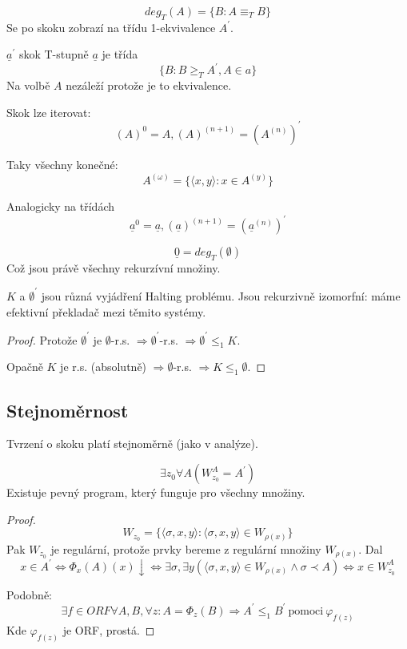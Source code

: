 \begin{note}
	\[ deg_T(A) = \{ B: A \equiv_T B \} \]
	Se po skoku zobrazí na třídu 1-ekvivalence $A^{\prime}$.

\end{note}

\begin{definition}\label{jump_T}
	$\underline{a}^{\prime}$ skok T-stupně $\underline{a}$ je třída
	\[ \{ B: B \geq_T A^{\prime}, A \in a \} \]
	Na volbě $A$ nezáleží protože je to ekvivalence.
\end{definition}

\begin{note}
	Skok lze iterovat:
	\[ (A)^0 = A, (A)^{(n + 1)} = (A^{(n)})^{\prime} \]

	Taky všechny konečné:
	\[ A^{(\omega)} = \{ \langle x, y \rangle: x \in A^{(y)} \} \]

	Analogicky na třídách
	\[ \underline{a}^0 = \underline{a}, (\underline{a})^{(n + 1)} = (\underline{a}^{(n)})^{\prime} \]
\end{note}

\begin{observation}
	\[ \underline{0} = deg_T(\emptyset) \]
	Což jsou právě všechny rekurzívní množiny.
\end{observation}

\begin{observation}
	$K$ a $\emptyset^{\prime}$ jsou různá vyjádření Halting problému.
	Jsou rekurzivně izomorfní: máme efektivní překladač mezi těmito systémy.
\end{observation}
\begin{proof}
	Protože $\emptyset^{\prime}$ je $\emptyset$-r.s. $\Rightarrow \emptyset^{\prime}$-r.s. $\Rightarrow \emptyset^{\prime}  \leq_1 K $.

	Opačně $K$ je r.s. (absolutně) $\Rightarrow \emptyset$-r.s. $\Rightarrow K \leq_1 \emptyset$.
\end{proof}

\subsection{Stejnoměrnost}
Tvrzení o skoku platí stejnoměrně (jako v analýze).

\begin{theorem}
	\[ \exists z_0 \forall A (W_{z_0}^A = A^{\prime}) \]
	Existuje pevný program, který funguje pro všechny množiny.
\end{theorem}
\begin{proof}
	\[ W_{z_0} = \{ \langle \sigma, x, y \rangle: \langle \sigma, x, y \rangle \in W_{\rho(x)} \} \]
	Pak $W_{z_0}$ je regulární, protože prvky bereme z regulární množiny $W_{\rho(x)}$.
	Dal
	\[ x \in A^{\prime} \iff \Phi_x(A)(x) \downarrow \iff \exists \sigma, \exists y(\langle \sigma, x, y \rangle \in W_{\rho(x)} \land \sigma \prec A) \iff x \in W_{z_0}^A \]

	Podobně: \[ \exists f \in ORF \forall A, B, \forall z: A = \Phi_z(B) \Rightarrow A^{\prime} \leq_1 B^{\prime}\ \text{pomoci}\ \varphi_{f(z)} \]
	Kde $\varphi_{f(z)}$ je ORF, prostá.
\end{proof}
